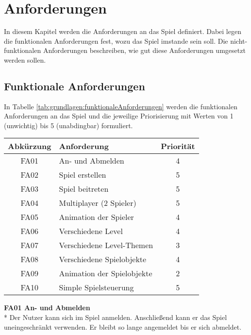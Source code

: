 
\chapter{Anforderungen}
\label{cha:anforderungen}
In diesem Kapitel werden die Anforderungen an das Spiel definiert. Dabei legen die funktionalen Anforderungen fest, wozu das Spiel imstande sein soll. Die nicht-funktionalen Anforderungen beschreiben, wie gut diese Anforderungen umgesetzt werden sollen.

\section{Funktionale Anforderungen}
\label{sec:grundlagen:funktionaleAnforderungen}
In Tabelle \ref{tab:grundlagen:funktionaleAnforderungen} werden die funktionalen Anforderungen an das Spiel und die jeweilige Priorisierung mit Werten von 1 (unwichtig) bis 5 (unabdingbar) formuliert.

\begin{center}
    \label{tab:grundlagen:funktionaleAnforderungen}
    \begin{tabular}{ c | l | c}
        Abkürzung & Anforderung & Priorität\\
        \hline
        FA01 & An- und Abmelden & 4 \\
        \hline
        FA02 & Spiel erstellen & 5 \\
        \hline
        FA03 & Spiel beitreten & 5 \\
        \hline
        FA04 & Multiplayer (2 Spieler) & 5 \\
        \hline
        FA05 & Animation der Spieler & 4 \\
        \hline
        FA06 & Verschiedene Level & 4 \\
        \hline
        FA07 & Verschiedene Level-Themen & 3 \\
        \hline
        FA08 & Verschiedene Spielobjekte & 4 \\
        \hline
        FA09 & Animation der Spielobjekte & 2 \\
        \hline
        FA10 & Simple Spielsteuerung & 5 \\
    \end{tabular}
\end{center}

\textbf{FA01 An- und Abmelden}\\*
Der Nutzer kann sich im Spiel anmelden. Anschließend kann er das Spiel uneingeschränkt verwenden. Er bleibt so lange angemeldet bis er sich abmeldet.

